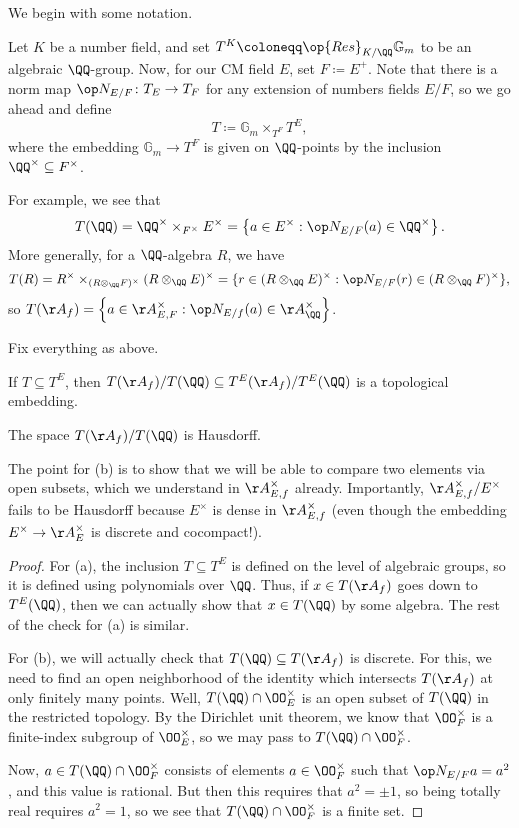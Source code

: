 \documentclass[../notes.tex]{subfiles}
\begin{document}
We begin with some notation.
\begin{notation}
	Let $K$ be a number field, and set $T^K\coloneqq\op{Res}_{K/\QQ}\mathbb G_m$ to be an algebraic $\QQ$-group. Now, for our CM field $E$, set $F\coloneqq E^+$. Note that there is a norm map $\op N_{E/F}\colon T_E\to T_F$ for any extension of numbers fields $E/F$, so we go ahead and define
	\[T\coloneqq\mathbb G_m\times_{T^F}T^E,\]
	where the embedding $\mathbb G_m\to T^F$ is given on $\QQ$-points by the inclusion $\QQ^\times\subseteq F^\times$.
\end{notation}
For example, we see that
\[T(\QQ)=\QQ^\times\times_{F^\times}E^\times=\left\{a\in E^\times:\op N_{E/F}(a)\in\QQ^\times\right\}.\]
More generally, for a $\QQ$-algebra $R$, we have
\[T(R)=R^\times\times_{(R\otimes_\QQ F)^\times}(R\otimes_\QQ E)^\times=\{r\in(R\otimes_\QQ E)^\times:\op N_{E/F}(r)\in(R\otimes_\QQ F)^\times\},\]
so $T(\AA_f)=\left\{a\in\AA_{E,F}^\times:\op N_{E/f}(a)\in\AA_\QQ^\times\right\}$.
\begin{lemma} \label{lem:get-to-hausdorff-quotient}
	Fix everything as above.
	\begin{listalph}
		\item If $T\subseteq T^E$, then $T(\AA_{f})/T(\QQ)\subseteq T^E(\AA_f)/T^E(\QQ)$ is a topological embedding. 
		\item The space $T(\AA_f)/T(\QQ)$ is Hausdorff.
	\end{listalph}
\end{lemma}
The point for (b) is to show that we will be able to compare two elements via open subsets, which we understand in $\AA_{E,f}^\times$ already. Importantly, $\AA_{E,f}^\times/E^\times$ fails to be Hausdorff because $E^\times$ is dense in $\AA_{E,f}^\times$ (even though the embedding $E^\times\to\AA_{E}^\times$ is discrete and cocompact!).
\begin{proof}
	For (a), the inclusion $T\subseteq T^E$ is defined on the level of algebraic groups, so it is defined using polynomials over $\QQ$. Thus, if $x\in T(\AA_f)$ goes down to $T^E(\QQ)$, then we can actually show that $x\in T(\QQ)$ by some algebra. The rest of the check for (a) is similar.

	For (b), we will actually check that $T(\QQ)\subseteq T(\AA_f)$ is discrete. For this, we need to find an open neighborhood of the identity which intersects $T(\AA_f)$ at only finitely many points. Well, $T(\QQ)\cap\OO_E^\times$ is an open subset of $T(\QQ)$ in the restricted topology. By the Dirichlet unit theorem, we know that $\OO_F^\times$ is a finite-index subgroup of $\OO_E^\times$, so we may pass to $T(\QQ)\cap\OO_F^\times$.

	Now, $a\in T(\QQ)\cap\OO_F^\times$ consists of elements $a\in\OO_F^\times$ such that $\op N_{E/F}a=a^2$, and this value is rational. But then this requires that $a^2=\pm1$, so being totally real requires $a^2=1$, so we see that $T(\QQ)\cap\OO_F^\times$ is a finite set.
\end{proof}
\end{document}
